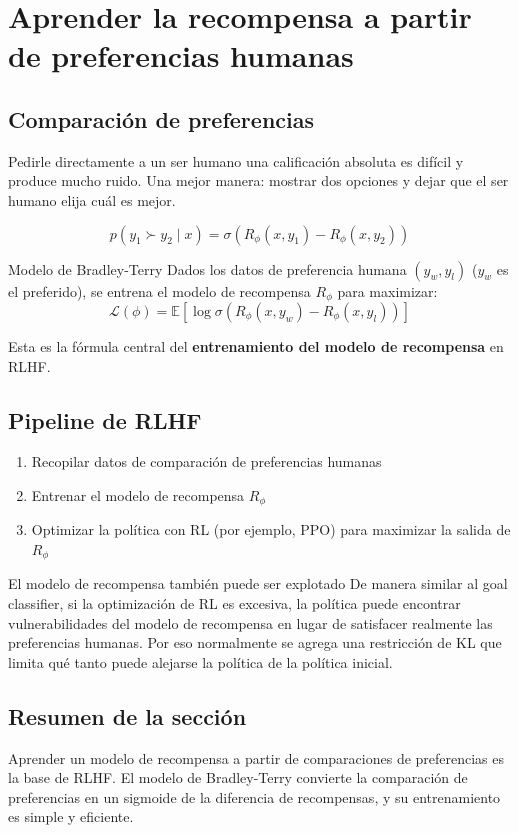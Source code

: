 \section{Aprender la recompensa a partir de preferencias humanas}

\subsection{Comparación de preferencias}

Pedirle directamente a un ser humano una calificación absoluta es difícil y produce mucho ruido. Una mejor manera: mostrar dos opciones y dejar que el ser humano elija cuál es mejor.

$$p(y_1 \succ y_2 \mid x) = \sigma\left(R_\phi(x, y_1) - R_\phi(x, y_2)\right)$$

\begin{importantbox}{Modelo de Bradley-Terry}
Dados los datos de preferencia humana $(y_w, y_l)$ ($y_w$ es el preferido), se entrena el modelo de recompensa $R_\phi$ para maximizar:
$$\mathcal{L}(\phi) = \mathbb{E}\left[\log \sigma\left(R_\phi(x, y_w) - R_\phi(x, y_l)\right)\right]$$

Esta es la fórmula central del \textbf{entrenamiento del modelo de recompensa} en RLHF.
\end{importantbox}

\subsection{Pipeline de RLHF}

\begin{enumerate}
    \item Recopilar datos de comparación de preferencias humanas
    \item Entrenar el modelo de recompensa $R_\phi$
    \item Optimizar la política con RL (por ejemplo, PPO) para maximizar la salida de $R_\phi$
\end{enumerate}

\begin{warningbox}{El modelo de recompensa también puede ser explotado}
De manera similar al goal classifier, si la optimización de RL es excesiva, la política puede encontrar vulnerabilidades del modelo de recompensa en lugar de satisfacer realmente las preferencias humanas. Por eso normalmente se agrega una restricción de KL que limita qué tanto puede alejarse la política de la política inicial.
\end{warningbox}

\subsection{Resumen de la sección}

Aprender un modelo de recompensa a partir de comparaciones de preferencias es la base de RLHF. El modelo de Bradley-Terry convierte la comparación de preferencias en un sigmoide de la diferencia de recompensas, y su entrenamiento es simple y eficiente.

